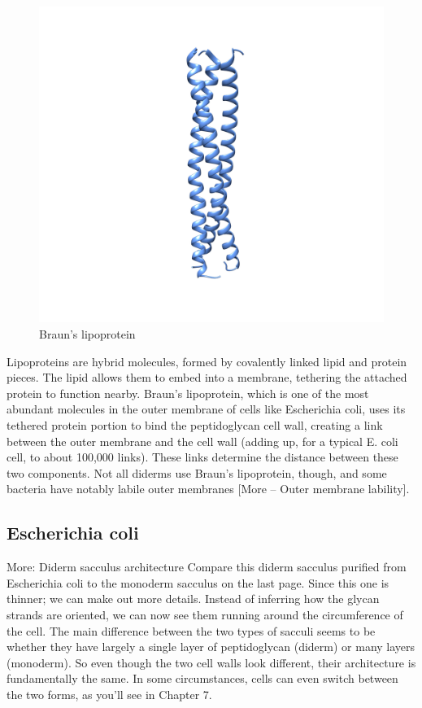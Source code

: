 \documentclass[]{tufte-book}
\begin{document}
\begin{figure}
\includegraphics{img/02_schematic/2_3_1_BLP} \caption[Braun's lipoprotein]{Braun's lipoprotein}\label{fig:2-3-1}
\end{figure}

Lipoproteins are hybrid molecules, formed by covalently linked lipid and
protein pieces. The lipid allows them to embed into a membrane,
tethering the attached protein to function nearby. Braun's lipoprotein,
which is one of the most abundant molecules in the outer membrane of
cells like Escherichia coli, uses its tethered protein portion to bind
the peptidoglycan cell wall, creating a link between the outer membrane
and the cell wall (adding up, for a typical E. coli cell, to about
100,000 links). These links determine the distance between these two
components. Not all diderms use Braun's lipoprotein, though, and some
bacteria have notably labile outer membranes {[}More -- Outer membrane
lability{]}.

\subsection{Escherichia coli}\label{escherichia-coli}

More: Diderm sacculus architecture Compare this diderm sacculus purified
from Escherichia coli to the monoderm sacculus on the last page. Since
this one is thinner; we can make out more details. Instead of inferring
how the glycan strands are oriented, we can now see them running around
the circumference of the cell. The main difference between the two types
of sacculi seems to be whether they have largely a single layer of
peptidoglycan (diderm) or many layers (monoderm). So even though the two
cell walls look different, their architecture is fundamentally the same.
In some circumstances, cells can even switch between the two forms, as
you'll see in Chapter 7.
\end{document}
